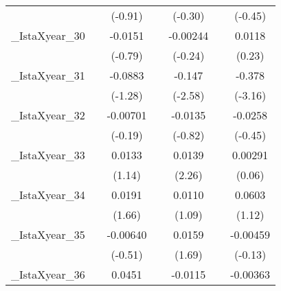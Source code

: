 {\begin{tabular}{l*{6}{c}}
            &                     &     (-0.91)         &                     &     (-0.30)         &                     &     (-0.45)         \\
[1em]
\_IstaXyear\_30&                     &     -0.0151         &                     &    -0.00244         &                     &      0.0118         \\
            &                     &     (-0.79)         &                     &     (-0.24)         &                     &      (0.23)         \\
[1em]
\_IstaXyear\_31&                     &     -0.0883         &                     &      -0.147\sym{*}  &                     &      -0.378\sym{**} \\
            &                     &     (-1.28)         &                     &     (-2.58)         &                     &     (-3.16)         \\
[1em]
\_IstaXyear\_32&                     &    -0.00701         &                     &     -0.0135         &                     &     -0.0258         \\
            &                     &     (-0.19)         &                     &     (-0.82)         &                     &     (-0.45)         \\
[1em]
\_IstaXyear\_33&                     &      0.0133         &                     &      0.0139\sym{*}  &                     &     0.00291         \\
            &                     &      (1.14)         &                     &      (2.26)         &                     &      (0.06)         \\
[1em]
\_IstaXyear\_34&                     &      0.0191         &                     &      0.0110         &                     &      0.0603         \\
            &                     &      (1.66)         &                     &      (1.09)         &                     &      (1.12)         \\
[1em]
\_IstaXyear\_35&                     &    -0.00640         &                     &      0.0159         &                     &    -0.00459         \\
            &                     &     (-0.51)         &                     &      (1.69)         &                     &     (-0.13)         \\
[1em]
\_IstaXyear\_36&                     &      0.0451         &                     &     -0.0115         &                     &    -0.00363         \\

\end{tabular}}
